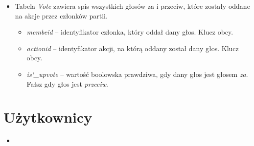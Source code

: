 \documentclass[12pt]{article}
\begin{document}
\begin{itemize}
\begin{itemize}
    \end{itemize}
    \item{Tabela \textit{Vote} zawiera spis wszystkich głosów za i przeciw, 
          które zostały oddane na akcje przez członków partii.}
    \begin{itemize}
        \item{\textit{membeid} -- identyfikator członka, który oddał dany głos.
              Klucz obcy.}
        \item{\textit{actionid} -- identyfikator akcji, na którą oddany został
              dany głos. Klucz obcy.}
        \item{\textit{is\char`_upvote} -- wartość boolowska prawdziwa, gdy dany
              głos jest głosem \textit{za}. Fałsz gdy głos jest \textit{przeciw}.}
    \end{itemize}
\end{itemize}

\section{Użytkownicy}

\begin{itemize}
    \item{}
\end{itemize}
\end{document}
